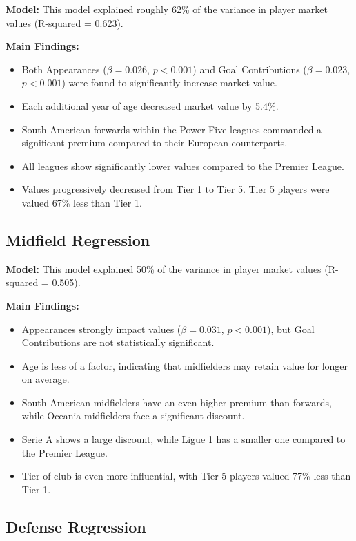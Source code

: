 \documentclass[12pt,a4paper]{article}
\begin{document}
\textbf{Model:} This model explained roughly 62\% of the variance in player market values (R-squared = 0.623).

\textbf{Main Findings:}
\begin{itemize}
    \item Both Appearances ($\beta = 0.026$, $p < 0.001$) and Goal Contributions ($\beta = 0.023$, $p < 0.001$) were found to significantly increase market value.  
    \item Each additional year of age decreased market value by 5.4\%.
    \item South American forwards within the Power Five leagues commanded a significant premium compared to their European counterparts. 
    \item All leagues show significantly lower values compared to the Premier League. 
    \item Values progressively decreased from Tier 1 to Tier 5. Tier 5 players were valued 67\% less than Tier 1.
\end{itemize}

\subsection{Midfield Regression}
\label{subsec:Midfield}

\textbf{Model:} This model explained 50\% of the variance in player market values (R-squared = 0.505).

\textbf{Main Findings:}
\begin{itemize}
    \item Appearances strongly impact values ($\beta = 0.031$, $p < 0.001$), but Goal Contributions are not statistically significant. 
    \item Age is less of a factor, indicating that midfielders may retain value for longer on average. 
    \item South American midfielders have an even higher premium than forwards, while Oceania midfielders face a significant discount. 
    \item Serie A shows a large discount, while Ligue 1 has a smaller one compared to the Premier League. 
    \item Tier of club is even more influential, with Tier 5 players valued 77\% less than Tier 1.
\end{itemize}

\subsection{Defense Regression}
\label{subsec:Defense}
\end{document}
